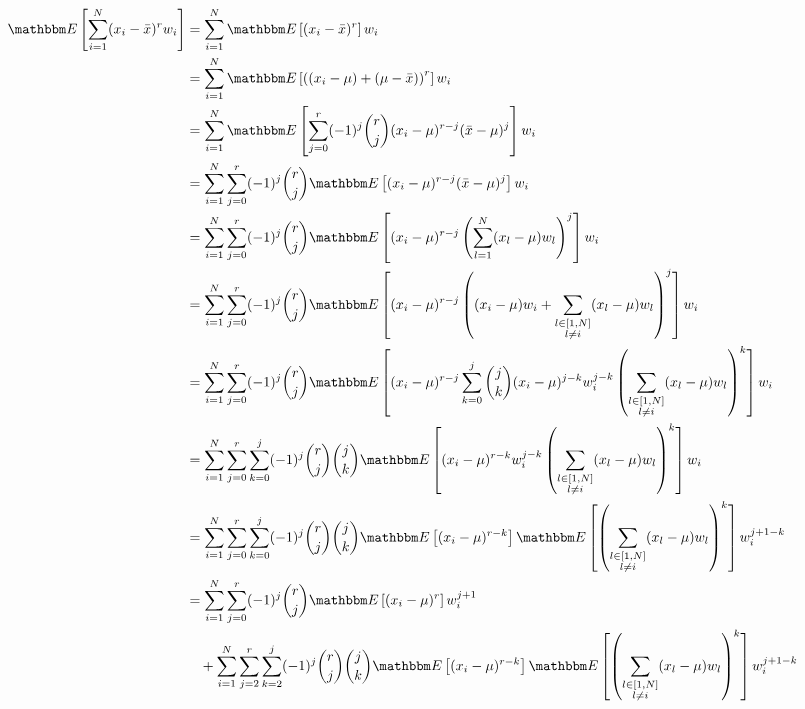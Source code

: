 \documentclass{article}
\newcommand{\E}[1]{\mathbbm E\left[#1\right]}
\begin{document}
\begin{align}
    \E{\sum_{i=1}^N (x_i - {\bar x})^r w_i} &=  \sum_{i=1}^N \E{(x_i - {\bar x})^r} w_i \\\nonumber
    &=  \sum_{i=1}^N \E{\left((x_i - \mu) + (\mu - {\bar x})\right)^r} w_i \\\nonumber 
    &=  \sum_{i=1}^N \E{\sum_{j=0}^r (-1)^j \binom{r}{j} (x_i - \mu)^{r-j}({\bar x} - \mu)^{j}} w_i  \\\nonumber
    &=  \sum_{i=1}^N \sum_{j=0}^r (-1)^j \binom{r}{j} \E{(x_i - \mu)^{r-j}({\bar x} - \mu)^{j}} w_i  \\\nonumber
    &=  \sum_{i=1}^N \sum_{j=0}^r (-1)^j \binom{r}{j} \E{(x_i - \mu)^{r-j}\left(\sum_{l=1}^N (x_l - \mu)w_l\right)^j} w_i \\\nonumber 
    &=  \sum_{i=1}^N \sum_{j=0}^r (-1)^j \binom{r}{j} \E{(x_i - \mu)^{r-j}\left((x_i - \mu)w_i + \sum_{\substack{l \in [1, N] \\ l \neq i}} (x_l - \mu)w_l\right)^j} w_i \\\nonumber 
    &=  \sum_{i=1}^N \sum_{j=0}^r (-1)^j \binom{r}{j} \E{(x_i - \mu)^{r-j}
    \sum_{k=0}^j \binom{j}{k} (x_i - \mu)^{j-k} w_i^{j-k}  \left(\sum_{\substack{l \in [1, N] \\ l \neq i}} (x_l - \mu)w_l\right)^k} w_i \\\nonumber 
    &=  \sum_{i=1}^N \sum_{j=0}^r \sum_{k=0}^j (-1)^j \binom{r}{j} \binom{j}{k} \E{(x_i - \mu)^{r-k}w_i^{j-k}
     \left(\sum_{\substack{l \in [1, N] \\ l \neq i}} (x_l - \mu)w_l\right)^k} w_i \\\nonumber 
    &=  \sum_{i=1}^N \sum_{j=0}^r \sum_{k=0}^j (-1)^j \binom{r}{j} \binom{j}{k} \E{(x_i - \mu)^{r-k}} 
     \E{\left(\sum_{\substack{l \in [1,N] \\ l \neq i}} (x_l - \mu)w_l\right)^k} w_i^{j+1-k} \\\nonumber 
    &=  \sum_{i=1}^N \sum_{j=0}^r  (-1)^j \binom{r}{j} \E{(x_i - \mu)^{r}} w_i^{j+1} \\\nonumber 
    & \quad + \sum_{i=1}^N \sum_{j=2}^r \sum_{k=2}^j (-1)^j \binom{r}{j} \binom{j}{k} \E{(x_i - \mu)^{r-k}}
     \E{\left(\sum_{\substack{l \in [1, N] \\ l \neq i}} (x_l - \mu)w_l\right)^k} w_i^{j+1-k}
\end{align}
\end{document}
